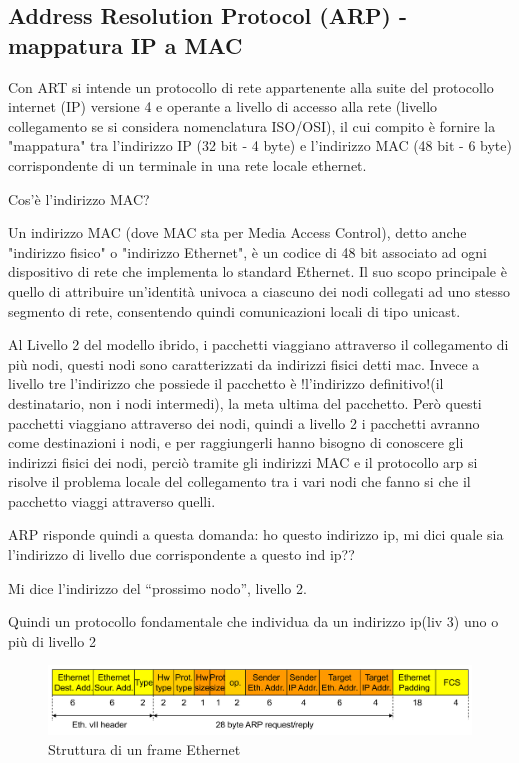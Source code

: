 \newpage
\subsection{Address Resolution Protocol (ARP) - mappatura IP a MAC}
Con ART si intende un protocollo di rete appartenente alla suite del protocollo internet (IP) versione 4 e operante a livello di accesso alla rete (livello collegamento se si considera nomenclatura ISO/OSI), il cui compito è fornire la "mappatura" tra l'indirizzo IP (32 bit - 4 byte) e l'indirizzo MAC (48 bit - 6 byte) corrispondente di un terminale in una rete locale ethernet.

Cos'è l'indirizzo MAC? 

Un indirizzo MAC (dove MAC sta per Media Access Control), detto anche "indirizzo fisico" o "indirizzo Ethernet", è un codice di 48 bit associato ad ogni dispositivo di rete che implementa lo standard Ethernet. Il suo scopo principale è quello di attribuire un'identità univoca a ciascuno dei nodi collegati ad uno stesso segmento di rete, consentendo quindi comunicazioni locali di tipo unicast. 

Al Livello 2 del modello ibrido, i pacchetti viaggiano attraverso il collegamento di più nodi, questi nodi sono caratterizzati da indirizzi fisici detti mac. 
Invece a livello tre l'indirizzo che possiede il pacchetto è !l'indirizzo definitivo!(il destinatario, non i nodi intermedi), la meta ultima del pacchetto. Però questi pacchetti viaggiano attraverso dei nodi, quindi a livello 2 i pacchetti avranno come destinazioni i nodi, e per raggiungerli hanno bisogno di conoscere gli indirizzi fisici dei nodi, perciò tramite gli indirizzi MAC e il protocollo arp si risolve il problema locale del collegamento tra i vari nodi che fanno si che il pacchetto viaggi attraverso quelli.

ARP risponde quindi a questa domanda: ho questo indirizzo ip, mi dici quale sia l'indirizzo di livello due corrispondente a questo ind ip??

Mi dice l'indirizzo del “prossimo nodo”, livello 2.

Quindi un protocollo fondamentale che individua da un indirizzo ip(liv 3) uno o più di livello 2


\begin{figure}[h!]
    \centering
    \includegraphics[width=1\textwidth]{images/frameethernet.png}
    \caption{Struttura di un frame Ethernet}
    \label{fig:frameethernet}
\end{figure}


